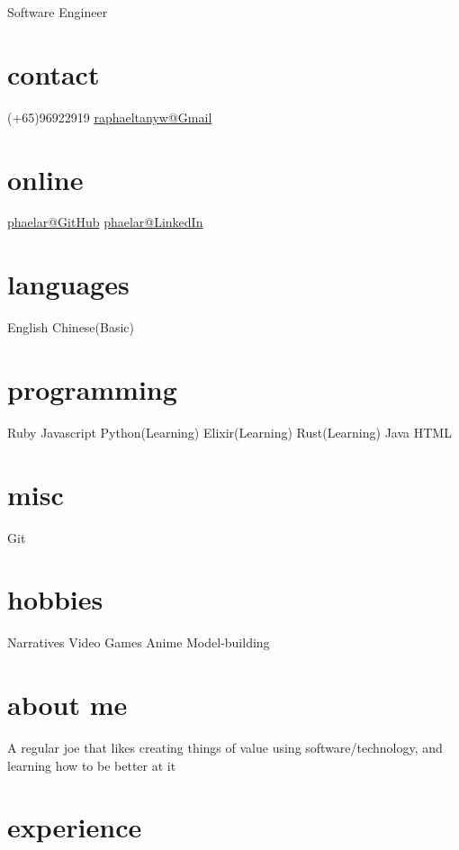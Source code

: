 \documentclass[]{friggeri-jj-cv}
\begin{document}
       {Software Engineer}

\begin{aside}
  \section{contact}
    (+65)96922919
    \href{mailto:raphaeltanyw@gmail.com}{raphaeltanyw@Gmail}
  \section{online}
    \href{https://github.com/phaelar}{phaelar@GitHub}
    \href{http://linkedin.com/in/phaelar}{phaelar@LinkedIn}
  \section{languages}
    English
    Chinese(Basic)
  \section{programming}
    Ruby
    Javascript
    Python(Learning)
    Elixir(Learning)
    Rust(Learning)
    Java
    HTML
  \section{misc}
    Git
  \section{hobbies}
   Narratives
   Video Games
   Anime
   Model-building
\end{aside}

\section{about me}

A regular joe that likes creating things of value using software/technology, and learning how to be better at it

\section{experience}
\end{document}
